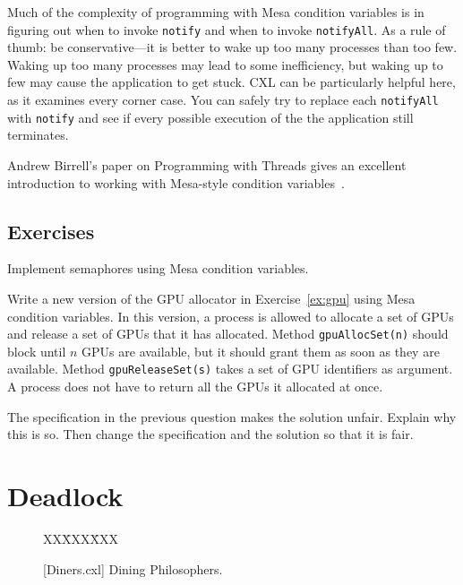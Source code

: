 \documentclass{report}
\newcommand{\cxlsource}[1]{
\begin{tabbing}
XX\=XXX\=XXX\kill
    
\end{tabbing}
}
\newenvironment{code}{
\tcolorbox
}{
\endtcolorbox
}
\begin{document}
Much of the complexity of programming with Mesa condition variables is in figuring out
when to invoke \texttt{notify} and when to invoke \texttt{notifyAll}.  As a rule of
thumb: be conservative---it is better to wake up too many processes than too few.
Waking up too many processes may lead to some inefficiency, but waking up to few
may cause the application to get stuck.  CXL can be particularly helpful here, as
it examines every corner case.  You can safely try to replace each \texttt{notifyAll}
with \texttt{notify} and see if every possible execution of the the application still
terminates.

Andrew Birrell's paper on Programming with Threads gives an excellent
introduction to working with Mesa-style condition variables~\cite{Birrell89}.

\section*{Exercises}
\begin{problems}
\item Implement semaphores using Mesa condition variables.
\item Write a new version of the GPU allocator in Exercise~\ref{ex:gpu}
using Mesa condition variables.
In this version,
a process is allowed to allocate a set of GPUs and release a set of GPUs that it
has allocated.  Method \texttt{gpuAllocSet(n)} should block until $n$ GPUs are
available, but it should grant them as soon as they are available.
Method \texttt{gpuReleaseSet(s)} takes a set of GPU identifiers as argument.
A process does not have to return all the GPUs it allocated at once.
\item The specification in the previous question makes the solution unfair.
Explain why this is so.  Then change the specification and the solution so that
it is fair.
\end{problems}

\chapter{Deadlock}
\label{ch:deadlock}


\begin{figure}
\begin{code}
\cxlsource{Diners}
\end{code}
\caption{[Diners.cxl] Dining Philosophers.}
\label{fig:diners}
\end{figure}
\end{document}
